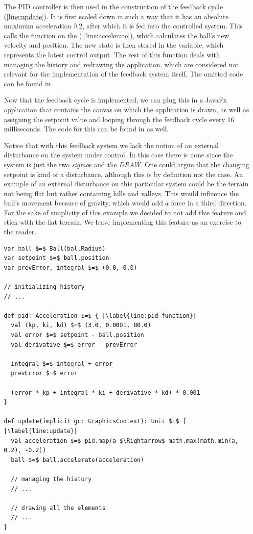 The PID controller is then used in the construction of the feedback cycle (\cref{line:update}). It is first scaled down in such a way that it has an absolute maximum acceleration $0.2$, after which it is fed into the controlled system. This calls the  function on the  ( \cref{line:accelerate}), which calculates the ball's new velocity and position. The new state is then stored in the  variable, which represents the latest control output. The rest of this function deals with managing the history and redrawing the application, which are considered not relevant for the implementation of the feedback system itself. The omitted code can be found in .

Now that the feedback cycle is implemented, we can plug this in a JavaFx application that contains the canvas on which the application is drawn, as well as assigning the setpoint value and looping through the feedback cycle every 16 milliseconds. The code for this can be found in  as well.

Notice that with this feedback system we lack the notion of an external disturbance on the system under control. In this case there is none since the system is just the two \textit{sigma}s and the \textit{DRAW}. One could argue that the changing setpoint is kind of a disturbance, although this is by definition not the case. An example of an external disturbance on this particular system could be the terrain not being flat but rather containing hills and valleys. This would influence the ball's movement because of gravity, which would add a force in a third direction. For the sake of simplicity of this example we decided to not add this feature and stick with the flat terrain. We leave implementing this feature as an exercise to the reader.

\hspace*{-\parindent}
\begin{minipage}{\linewidth}
\begin{lstlisting}[style=ScalaStyle, caption={Ball drawing}, label={lst:ball-feedback}]
var ball $=$ Ball(ballRadius)
var setpoint $=$ ball.position
var prevError, integral $=$ (0.0, 0.0)

// initializing history
// ...

def pid: Acceleration $=$ { |\label{line:pid-function}|
  val (kp, ki, kd) $=$ (3.0, 0.0001, 80.0)
  val error $=$ setpoint - ball.position
  val derivative $=$ error - prevError

  integral $=$ integral + error
  prevError $=$ error

  (error * kp + integral * ki + derivative * kd) * 0.001
}

def update(implicit gc: GraphicsContext): Unit $=$ { |\label{line:update}|
  val acceleration $=$ pid.map(a $\Rightarrow$ math.max(math.min(a, 0.2), -0.2))
  ball $=$ ball.accelerate(acceleration)

  // managing the history
  // ...

  // drawing all the elements
  // ...
}
\end{lstlisting}
\end{minipage}
